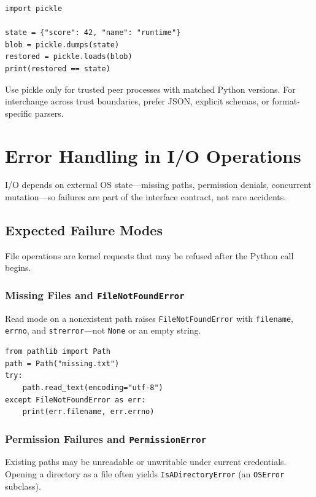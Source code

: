 \documentclass[a4paper,twoside]{report}
\begin{document}
\begin{verbatim}
import pickle

state = {"score": 42, "name": "runtime"}
blob = pickle.dumps(state)
restored = pickle.loads(blob)
print(restored == state)
\end{verbatim}

Use pickle only for trusted peer processes with matched Python versions. For interchange across trust boundaries, prefer JSON, explicit schemas, or format-specific parsers.


\section{Error Handling in I/O Operations}

I/O depends on external OS state---missing paths, permission denials, concurrent mutation---so failures are part of the interface contract, not rare accidents.


\subsection{Expected Failure Modes}

File operations are kernel requests that may be refused after the Python call begins.

\subsubsection{Missing Files and \texttt{FileNotFoundError}}

Read mode on a nonexistent path raises \texttt{FileNotFoundError} with \texttt{filename}, \texttt{errno}, and \texttt{strerror}---not \texttt{None} or an empty string.

\begin{verbatim}
from pathlib import Path
path = Path("missing.txt")
try:
    path.read_text(encoding="utf-8")
except FileNotFoundError as err:
    print(err.filename, err.errno)
\end{verbatim}

\subsubsection{Permission Failures and \texttt{PermissionError}}

Existing paths may be unreadable or unwritable under current credentials. Opening a directory as a file often yields \texttt{IsADirectoryError} (an \texttt{OSError} subclass).
\end{document}

